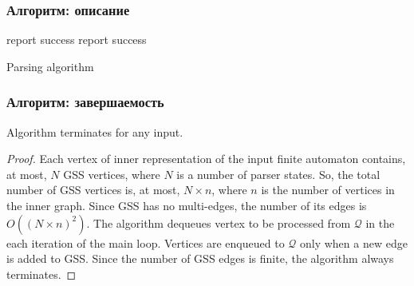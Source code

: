 \documentclass{beamer}
\begin{document}
\begin{frame}[fragile] 
    \transwipe[direction=90]
    \frametitle{Алгоритм: описание}
\begin{algorithm}[H] 
\begin{algorithmic}[1]
     {report success}
    \EndIf
  \Else
    \EndWhile
     {report success}
    \EndIf
  \EndIf
\EndFunction
\end{algorithmic}
\caption{Parsing algorithm}
\label{parsing}
\end{algorithm}
\end{frame}

\begin{frame}
    \transwipe[direction=90]
    \frametitle{Алгоритм: завершаемость}
    \begin{theorem}
             Algorithm terminates for any input.
    \end{theorem}

    \begin{proof}
       Each vertex of inner representation of the input finite automaton contains, at most, 
$N$ GSS vertices, where $N$ is a number of parser states. So, the total number of 
GSS vertices is, at most, $N\times n$, where $n$ is the number of vertices in the inner graph. 
Since GSS has no multi-edges, the number of its edges is $O((N\times n)^2)$. The algorithm 
dequeues vertex to be processed from $\mathcal Q$ in the each iteration of the 
main loop. Vertices are enqueued to $\mathcal Q$ only when a new edge is added to GSS. Since the number of 
GSS edges is finite, the algorithm always terminates.
    \end{proof}

\end{frame}
\end{document}
